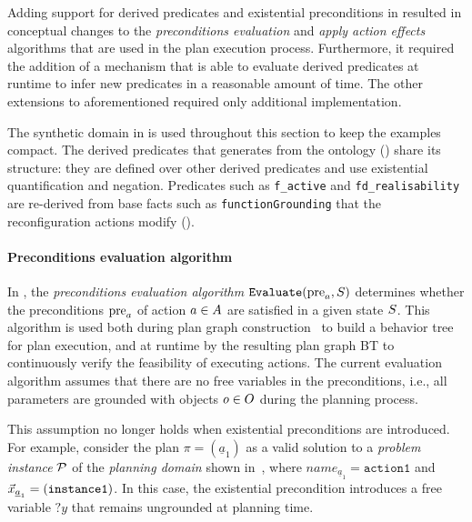 Adding support for derived predicates and existential preconditions in \plansys resulted in conceptual changes to the \emph{preconditions evaluation} and \emph{apply action effects} algorithms that are used in the plan execution process. Furthermore, it required the addition of a mechanism that is able to evaluate derived predicates at runtime to infer new predicates in a reasonable amount of time. The other extensions to \plansys aforementioned required only additional implementation.

The synthetic domain in  is used throughout this section to keep the examples compact. The derived predicates that \owltopddl generates from the \pddltomasys ontology () share its structure: they are defined over other derived predicates and use existential quantification and negation. Predicates such as \texttt{f\_active} and \texttt{fd\_realisability} are re-derived from base facts such as \texttt{functionGrounding} that the reconfiguration actions modify ().

\paragraph{Preconditions evaluation algorithm}

In \plansys, the \emph{preconditions evaluation algorithm} $\texttt{Evaluate}(\operatorname{pre}_a, S)$ determines whether the preconditions $\operatorname{pre}_a$ of action $a \in A$ are satisfied in a given state $S$. This algorithm is used both during plan graph construction~\cite{pddl_plans_bt} to build a behavior tree for plan execution,
and at runtime by the resulting plan graph BT to continuously verify the feasibility of executing actions. The current evaluation algorithm assumes that there are no free variables in the preconditions, i.e., all parameters are grounded with objects $o \in O$ during the planning process.

This assumption no longer holds when existential preconditions are introduced. For example, consider the plan $\pi = (\underline{a}_1)$ as a valid solution to a \emph{problem instance} $\mathcal{P}$ of the \emph{planning domain} shown in~, where $name_{\underline{a}_1} = \texttt{action1}$ and $\vec{x}_{\underline{a}_1} = (\texttt{instance1})$. In this case, the existential precondition introduces a free variable $?y$ that remains ungrounded at planning time.

